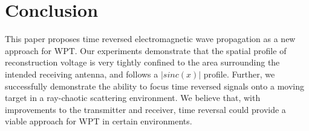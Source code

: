 \section{Conclusion}
\label{sec:conclusion}

This paper proposes time reversed electromagnetic wave propagation as a new
approach for WPT.
%
Our experiments demonstrate that the spatial profile of reconstruction voltage
is very tightly confined to the area surrounding the intended receiving antenna,
and follows a $\left|sinc(x)\right|$ profile.
%
Further, we successfully demonstrate the ability to focus time reversed signals
onto a moving target in a ray-chaotic scattering environment.
%
We believe that, with improvements to the transmitter and receiver, time reversal
could provide a viable approach for WPT in certain environments.
